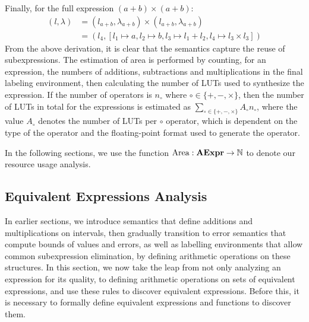 Finally, for the full expression $(a + b) \times (a + b)$:
\begin{equation}
    \begin{aligned}
        (l, \lambda)
            &= (l_{a + b}, \lambda_{a + b}) \times
               (l_{a + b}, \lambda_{a + b}) \\
            &= (l_4, [l_1\mapsto{a}, l_2\mapsto{b},
                      l_3\mapsto{l_1 + l_2}, l_4\mapsto{l_3 \times l_3}])
    \end{aligned}
\end{equation}
From the above derivation, it is clear that the semantics capture the reuse
of subexpressions. The estimation of area is performed by counting, for an
expression, the numbers of additions, subtractions and multiplications in
the final labeling environment, then calculating the number of LUTs used to
synthesize the expression. If the number of operators is $n_\circ$ where
$\circ\in\{+,-,\times\}$, then the number of LUTs in total for the expressions
is estimated as $\sum_{\circ\in\{+,-,\times\}} A_\circ n_\circ$, where the
value $A_\circ$ denotes the number of LUTs per $\circ$ operator, which is
dependent on the type of the operator and the floating-point format used to
generate the operator.

In the following sections, we use the function $\operatorname{\mathrm{Area}}: \mathbf{AExpr}\to\mathbb{N}$
to denote our resource usage analysis.

\subsection{Equivalent Expressions Analysis}
\label{so:sub:equivalent_expressions_analysis}

In earlier sections, we introduce semantics that define additions and
multiplications on intervals, then gradually transition to error semantics that
compute bounds of values and errors, as well as labelling environments that
allow common subexpression elimination, by defining arithmetic operations on
these structures. In this section, we now take the leap from not only analyzing
an expression for its quality, to defining arithmetic operations on sets of
equivalent expressions, and use these rules to discover equivalent expressions.
Before this, it is necessary to formally define equivalent expressions and
functions to discover them.


